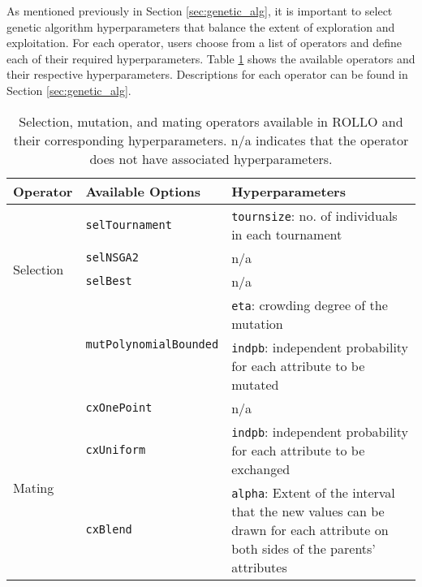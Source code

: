 As mentioned previously in Section \ref{sec:genetic_alg}, it is important to 
select genetic algorithm hyperparameters that balance the extent of exploration 
and exploitation. 
For each operator, users choose from a list of operators and define each
of their required hyperparameters. 
Table \ref{tab:deap_operators} shows the available operators and their respective 
hyperparameters. 
Descriptions for each operator can be found in Section \ref{sec:genetic_alg}.
\begin{table}[htbp]
    \centering
    \onehalfspacing
    \caption{Selection, mutation, and mating operators available in 
    \acrfull{ROLLO} and their corresponding hyperparameters. n/a indicates that 
    the operator does not have associated hyperparameters. }
	\label{tab:deap_operators}
    \footnotesize
    \begin{tabular}{l|p{}|p{}}
    \hline
    \textbf{Operator} & \textbf{Available Options} & \textbf{Hyperparameters} \\ \hline
    \multirow{4}{1cm}{Selection} & \texttt{selTournament} & \texttt{tournsize}: no. of individuals in each tournament\\ \cline{2-3}
    & \texttt{selNSGA2} & n/a \\ \cline{2-3}
    & \texttt{selBest} & n/a \\ \hline
    \multirow{2}{1cm}{Mutation} & \multirow{2}{2cm}{\texttt{mutPolynomialBounded}} & \texttt{eta}: crowding degree of the mutation\\  
    && \texttt{indpb}: independent probability for each attribute to be mutated\\ \hline
    \multirow{3}{1cm}{Mating} & \texttt{cxOnePoint} & n/a \\ \cline{2-3}
    & \texttt{cxUniform} & \texttt{indpb}: independent probability for each attribute to be exchanged\\ \cline{2-3}
    & \texttt{cxBlend} & \texttt{alpha}: Extent of the interval that the new values can be drawn for each attribute on both sides of the parents’ attributes\\ \hline
    \end{tabular}
    \end{table}

